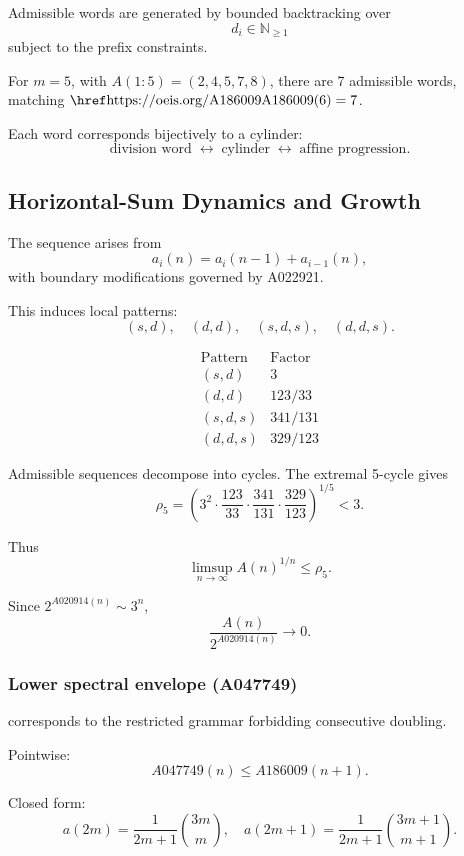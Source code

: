 \documentclass[12pt, oneside]{article}
\numberwithin{equation}{section}
\theoremstyle{definition}
\theoremstyle{plain}
\theoremstyle{remark}
\begin{document}
Admissible words are generated by bounded backtracking over
\[
d_i \in \mathbb{N}_{\ge 1}
\]
subject to the prefix constraints.

For $m=5$, with $A(1{:}5) = (2,4,5,7,8)$, there are 7 admissible words,
matching $\text{\OEIS{A186009}}(6)=7$.

Each word corresponds bijectively to a cylinder:
\[
\text{division word} \;\leftrightarrow\; \text{cylinder} \;\leftrightarrow\; \text{affine progression}.
\]

\subsection{Horizontal-Sum Dynamics and Growth}
\label{app:spine-growth}

The sequence  arises from
\[
a_i(n) = a_i(n-1) + a_{i-1}(n),
\]
with boundary modifications governed by A022921.

This induces local patterns:
\[
(s,d), \quad (d,d), \quad (s,d,s), \quad (d,d,s).
\]

\[
\begin{array}{c|c}
\text{Pattern} & \text{Factor} \\
\hline
(s,d) & 3 \\
(d,d) & 123/33 \\
(s,d,s) & 341/131 \\
(d,d,s) & 329/123
\end{array}
\]

Admissible sequences decompose into cycles. The extremal 5-cycle gives
\[
\rho_5 =
\left(
3^2 \cdot \frac{123}{33} \cdot \frac{341}{131} \cdot \frac{329}{123}
\right)^{1/5}
< 3.
\]

Thus
\[
\limsup_{n\to\infty} A(n)^{1/n} \le \rho_5.
\]

Since $2^{A020914(n)} \sim 3^n$,
\[
\frac{A(n)}{2^{A020914(n)}} \to 0.
\]

\subsubsection*{Lower spectral envelope (A047749)}
\label{app:A047749-lower-bound}

 corresponds to the restricted grammar forbidding consecutive doubling.

Pointwise:
\[
A047749(n) \le A186009(n+1).
\]

Closed form:
\[
a(2m) = \frac{1}{2m+1}\binom{3m}{m}, \quad
a(2m+1) = \frac{1}{2m+1}\binom{3m+1}{m+1}.
\]
\end{document}
